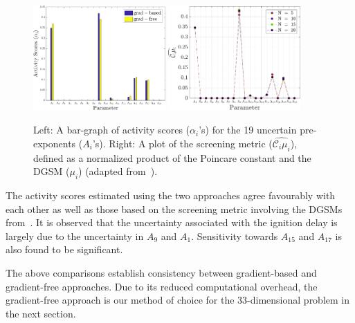 %
\begin{figure}[htbp]
 \begin{center}
  \includegraphics[width=0.45\textwidth]{./Figures/comp_as}
  \includegraphics[width=0.45\textwidth]{./Figures/ub_conv_kinetics_rich}
\caption{Left: A bar-graph of activity scores ($\alpha_i$'s) for the 19 uncertain pre-exponents ($A_i$'s).
Right: A plot of the screening metric ($\widehat{\mathcal{C}_i\mu_i}$), defined as a normalized product of the
Poincare constant and the DGSM ($\mu_i$) (adapted from~\cite{Vohra:2018}).}
\label{fig:comp_as}
\end{center}
\end{figure}
%
The activity scores estimated using the two approaches agree favourably with each other as well as those
based on the screening metric involving the DGSMs from~\cite{Vohra:2018}. It is observed that the uncertainty
associated with the ignition delay is largely due to the uncertainty in $A_9$ and $A_1$. Sensitivity towards
$A_{15}$ and $A_{17}$ is also found to be significant. 

The above comparisons establish consistency between gradient-based and
gradient-free approaches. Due to its reduced computational overhead, the
gradient-free approach is our method of choice for the 33-dimensional problem
in the next section. 


